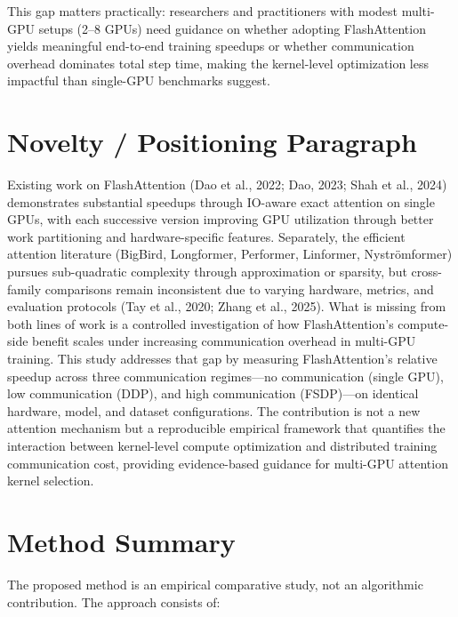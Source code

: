 \documentclass[12pt, a4paper]{article}
\begin{document}
This gap matters practically: researchers and practitioners with modest multi-GPU setups (2--8 GPUs) need guidance on whether adopting FlashAttention yields meaningful end-to-end training speedups or whether communication overhead dominates total step time, making the kernel-level optimization less impactful than single-GPU benchmarks suggest.

\section{Novelty / Positioning Paragraph}

Existing work on FlashAttention (Dao et al., 2022; Dao, 2023; Shah et al., 2024) demonstrates substantial speedups through IO-aware exact attention on single GPUs, with each successive version improving GPU utilization through better work partitioning and hardware-specific features. Separately, the efficient attention literature (BigBird, Longformer, Performer, Linformer, Nystr\"{o}mformer) pursues sub-quadratic complexity through approximation or sparsity, but cross-family comparisons remain inconsistent due to varying hardware, metrics, and evaluation protocols (Tay et al., 2020; Zhang et al., 2025). What is missing from both lines of work is a controlled investigation of how FlashAttention's compute-side benefit scales under increasing communication overhead in multi-GPU training. This study addresses that gap by measuring FlashAttention's relative speedup across three communication regimes---no communication (single GPU), low communication (DDP), and high communication (FSDP)---on identical hardware, model, and dataset configurations. The contribution is not a new attention mechanism but a reproducible empirical framework that quantifies the interaction between kernel-level compute optimization and distributed training communication cost, providing evidence-based guidance for multi-GPU attention kernel selection.

\section{Method Summary}

The proposed method is an empirical comparative study, not an algorithmic contribution. The approach consists of:
\end{document}
